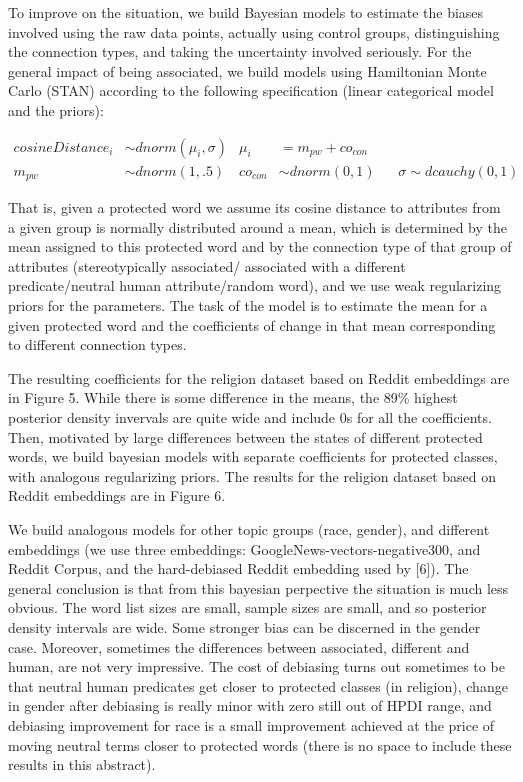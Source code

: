 \documentclass[
  12pt,
  dvipsnames,enabledeprecatedfontcommands]{scrartcl}
\begin{document}
To improve on the situation, we build Bayesian models to estimate the
biases involved using the raw data points, actually using control
groups, distinguishing the connection types, and taking the uncertainty
involved seriously. For the general impact of being associated, we build
models using Hamiltonian Monte Carlo (STAN) according to the following
specification (linear categorical model and the priors):

\footnotesize

\vspace{-5mm}

\begin{align}
cosineDistance_i  & \sim dnorm(\mu_i, \sigma) &
\mu_i & = m_{pw} + co_{con} \tag{Model}\\
m_{pw} & \sim dnorm(1,.5)  & 
co_{con} & \sim dnorm(0,1)  \,\,\,\,\,
 & \sigma  \sim  dcauchy(0,1) \tag{Priors}
\end{align} \normalsize 

\vspace{-2mm}

\noindent That is, given a protected word we assume its cosine distance
to attributes from a given group is normally distributed around a mean,
which is determined by the mean assigned to this protected word and by
the connection type of that group of attributes (stereotypically
associated/ associated with a different predicate/neutral human
attribute/random word), and we use weak regularizing priors for the
parameters. The task of the model is to estimate the mean for a given
protected word and the coefficients of change in that mean corresponding
to different connection types.

The resulting coefficients for the religion dataset based on Reddit
embeddings are in Figure 5. While there is some difference in the means,
the 89\% highest posterior density invervals are quite wide and include
0s for all the coefficients. Then, motivated by large differences
between the states of different protected words, we build bayesian
models with separate coefficients for protected classes, with analogous
regularizing priors. The results for the religion dataset based on
Reddit embeddings are in Figure 6.

We build analogous models for other topic groups (race, gender), and
different embeddings (we use three embeddings:
GoogleNews-vectors-negative300, and Reddit Corpus, and the hard-debiased
Reddit embedding used by {[}6{]}). The general conclusion is that from
this bayesian perpective the situation is much less obvious. The word
list sizes are small, sample sizes are small, and so posterior density
intervals are wide. Some stronger bias can be discerned in the gender
case. Moreover, sometimes the differences between associated, different
and human, are not very impressive. The cost of debiasing turns out
sometimes to be that neutral human predicates get closer to protected
classes (in religion), change in gender after debiasing is really minor
with zero still out of HPDI range, and debiasing improvement for race is
a small improvement achieved at the price of moving neutral terms closer
to protected words (there is no space to include these results in this
abstract).
\end{document}
